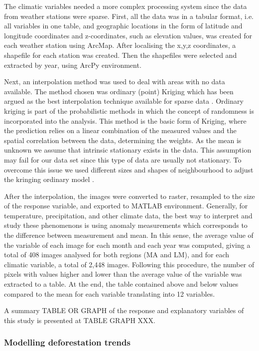 The climatic variables needed a more complex processing system since the data from weather stations were sparse. First, all the data was in a tabular format, i.e. all variables in one table, and geographic locations in the form of latitude and longitude coordinates and z-coordinates, such as elevation values, was created for each weather station using ArcMap. After localising the x,y,z coordinates, a shapefile for each station was created. Then the shapefiles were selected and extracted by year, using ArcPy environment. 

Next, an interpolation method was used to deal with areas with no data available. The method chosen was ordinary (point) Kriging which has been argued as the best interpolation technique available for sparse data \citep{SLUITER_2009}. Ordinary kriging is part of the probabilistic methods in which the concept of randomness is incorporated into the analysis. This method is the basic form of Kriging, where the prediction relies on a linear combination of the measured values and the spatial correlation between the data, determining the weights. As the mean is unknown we assume that intrinsic stationary exists in the data. This assumption may fail for our data set since this type of data are usually not stationary. To overcome this issue we used different sizes and shapes of neighbourhood to adjust the kringing ordinary model \citep{SLUITER_2009}. 

After the interpolation, the images were converted to raster, resampled to the size of the response variable, and exported to MATLAB environment. Generally, for temperature, precipitation, and other climate data, the best way to interpret and study these phenomenons is using anomaly measurements which corresponds to the difference between measurement and mean. In this sense, the average value of the variable of each image for each month and each year was computed, giving a total of 408 images analysed for both regions (MA and LM), and for each climatic variable, a total of 2,448 images. Following this procedure, the number of pixels with values higher and lower than the average value of the variable was extracted to a table. At the end, the table contained above and below values compared to the mean for each variable translating into 12 variables.

A summary TABLE OR GRAPH of the response and explanatory variables of this study is presented at TABLE GRAPH XXX.

\subsubsection{Modelling deforestation trends}  %


